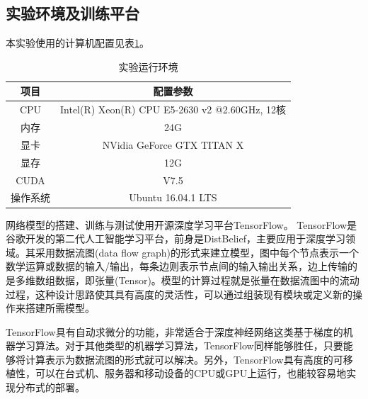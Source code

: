 \subsection{实验环境及训练平台}
本实验使用的计算机配置见表\ref{tab:3_3_experiment_environment}。
\begin{table}[htbp]
	\centering
	\caption{实验运行环境} \label{tab:3_3_experiment_environment}
	\begin{small} %
		\begin{tabular*}{\textwidth}{@{\extracolsep{\fill}}cc} \toprule[2pt]
			项目  & 配置参数  \\ \midrule[1pt]
			CPU & Intel(R) Xeon(R) CPU E5-2630 v2 @2.60GHz, 12核 \\
			内存 & 24G \\
			显卡 & NVidia GeForce GTX TITAN X \\
			显存 & 12G \\
			CUDA & V7.5 \\
			操作系统 & Ubuntu 16.04.1 LTS \\ \bottomrule[2pt]
		\end{tabular*}
	\end{small} %
\end{table}

网络模型的搭建、训练与测试使用开源深度学习平台TensorFlow\cite{abadi2016tensorflow}。
TensorFlow是谷歌开发的第二代人工智能学习平台，前身是DistBelief，主要应用于深度学习领域。其采用数据流图(data flow graph)的形式来建立模型，图中每个节点表示一个数学运算或数据的输入/输出，每条边则表示节点间的输入输出关系，边上传输的是多维数组数据，即张量(Tensor)。模型的计算过程就是张量在数据流图中的流动过程，这种设计思路使其具有高度的灵活性，可以通过组装现有模块或定义新的操作来搭建所需模型。

TensorFlow具有自动求微分的功能，非常适合于深度神经网络这类基于梯度的机器学习算法。对于其他类型的机器学习算法，TensorFlow同样能够胜任，只要能够将计算表示为数据流图的形式就可以解决。另外，TensorFlow具有高度的可移植性，可以在台式机、服务器和移动设备的CPU或GPU上运行，也能较容易地实现分布式的部署。

